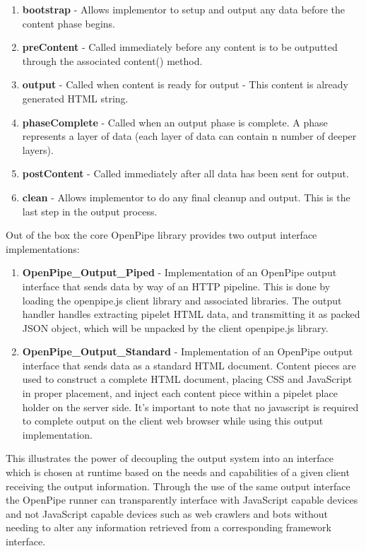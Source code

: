 \documentclass[12pt]{report}
\begin{document}
\begin{enumerate}
	\item \textbf{bootstrap} - Allows implementor to setup and output any data before the content phase begins.
	\item \textbf{preContent} - Called immediately before any content is to be outputted through the associated content() method. 
	\item \textbf{output} - Called when content is ready for output - This content is already generated HTML string.
	\item \textbf{phaseComplete} - Called when an output phase is complete. A phase represents a layer of data (each layer of data can contain n number of deeper layers).
	\item \textbf{postContent} - Called immediately after all data has been sent for output.
	\item \textbf{clean} - Allows implementor to do any final cleanup and output. This is the last step in the output process.
\end{enumerate}

Out of the box the core OpenPipe library provides two output interface implementations:

\begin{enumerate}
	\item \textbf{OpenPipe\_Output\_Piped} - Implementation of an OpenPipe output interface that sends data by way of an HTTP pipeline. This is done by loading the openpipe.js client library and associated libraries. The output handler handles extracting pipelet HTML data, and transmitting it as packed JSON object, which will be unpacked by the client openpipe.js library.
	\item \textbf{OpenPipe\_Output\_Standard} - Implementation of an OpenPipe output interface that sends data as a standard HTML document. Content pieces are used to construct a complete HTML document, placing CSS and JavaScript in proper placement, and inject each content piece within a pipelet place holder on the server side. It's important to note that no javascript is required to complete output on the client web browser while using this output implementation.
\end{enumerate}

This illustrates the power of decoupling the output system into an interface which is chosen at runtime based on the needs and capabilities of a given client receiving the output information. Through the use of the same output interface the OpenPipe runner can transparently interface with JavaScript capable devices and not JavaScript capable devices such as web crawlers and bots without needing to alter any information retrieved from a corresponding framework interface.
\end{document}
